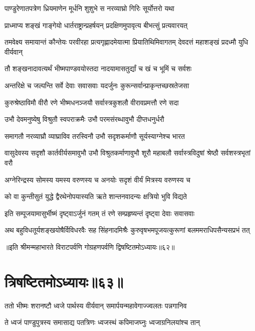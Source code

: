 \twolineshloka
{पाण्डुरेणातपत्रेण ध्रियमाणेन मूर्धनि}
{शुशुभे स नरव्याघ्रो गिरिः सूर्योत्तरो यथा}


\twolineshloka
{प्राध्माप्य शङ्खं गाङ्गेयो धार्तराष्ट्रान्प्रहर्षयन्}
{प्रदक्षिणमुपावृत्य बीभत्सुं प्रत्यवारयत्}


\threelineshloka
{तमवेक्ष्य समायान्तं कौन्तेयः परवीरहा}
{प्रत्यगृह्णादमेयात्मा प्रियातिथिमिवागतम्}
{देवदत्तं महाशङ्खं प्रदध्मौ युधि वीर्यवान्}


\twolineshloka
{तौ शङ्खनादावत्यर्थं भीष्मपाण्डवयोस्तदा}
{नादयामासतुर्द्यां च खं च भूमिं च सर्वशः}


\twolineshloka
{अन्तरिक्षे च जल्पन्ति सर्वे देवाः सवासवाः}
{यदर्जुनः कुरून्सर्वान्प्राकृन्तच्छस्रतेजसा}


\twolineshloka
{कुरुश्रेष्ठाविमौ वीरौ रणे भीष्मधनञ्जयौ}
{सर्वास्त्रकुशलौ वीरावप्रमत्तौ रणे सदा}


\twolineshloka
{उभौ देवमनुष्येषु विश्रुतौ स्वपराक्रमैः}
{उभौ परमसंरब्धावुभौ दीप्तधनुर्धरौ}


\twolineshloka
{समागतौ नरव्याघ्रौ व्याघ्राविव तरस्विनौ}
{उभौ सदृशकर्माणौ सूर्यस्याग्नेश्च भारत}


\threelineshloka
{वासुदेवस्य सदृशौ कार्तवीर्यसमावुभौ}
{उभौ विश्रुतकर्माणावुभौ शूरौ महाबलौ}
{सर्वास्त्रविदुषां श्रेष्ठौ सर्वशस्त्रभृतां वरौ}


\twolineshloka
{अग्नेरिन्द्रस्य सोमस्य यमस्य वरुणस्य च}
{अनयोः सदृशं वीर्यं मित्रस्य वरुणस्य च}


\twolineshloka
{को वा कुन्तीसुतं युद्धे द्वैरथेनोपयास्यति}
{ऋते शान्तनवादन्यः क्षत्रियो भुवि विद्यते}


\twolineshloka
{इति सम्पूजयामासुर्भीष्मं दृष्ट्वाऽर्जुनं गतम्}
{तं रणे सम्प्रहृष्यन्तं दृष्ट्वा देवाः सवासवाः}


\twolineshloka
{अथ बहुविधतूर्यशङ्खयोषैर्विविधरवैः सह सिंहनादमिश्रैः}
{कुरुवृषभमपूजयत्कुरूणां बलममराधिपसैन्यसप्रभं तत्}

॥इति श्रीमन्महाभारते विराटपर्वणि गोग्रहणपर्वणि द्विषष्टितमोऽध्यायः॥६२॥

\chapter{त्रिषष्टितमोऽध्यायः॥६३॥}

\twolineshloka
{ततो भीष्मः शरानष्टौ ध्वजे पार्थस्य वीर्यवान्}
{समार्पयन्महावेगाज्ज्वलतः पन्नगानिव}


\twolineshloka
{ते ध्वजं पाण्डुपुत्रस्य समासाद्य पतत्रिणः}
{ध्वजस्थं कपिमाजघ्नुः ध्वजाग्रनिलयांश्च तान्}


